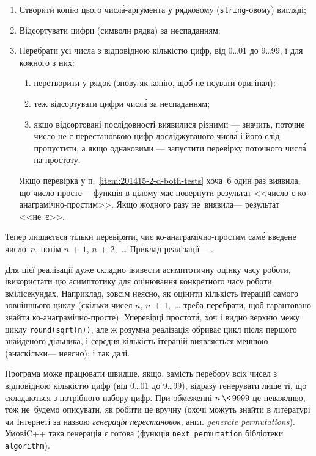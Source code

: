 \begin{enumerate}
\item
Створити копію цього числ\'{а}-аргумента у рядковому (\texttt{string}-овому) вигляді;
\item
Відсортувати цифри (символи рядка) за неспаданням;
\item
Перебрати усі числа з відповідною кількістю цифр, від 0\dots01 до 9\dots99, і для кожного з них:
\begin{enumerate}
\item
перетворити у рядок (знову як копію, щоб не псувати оригінал);
\item
теж відсортувати цифри числ\'{а} за неспаданням;
\item \label{item:201415-2-d-both-tests}
якщо відсортовані послідовності виявилися різними --- значить, поточне число не є перестановкою цифр досліджуваного числ\'{а} і його слід пропустити, а якщо однаковими --- запустити перевірку поточного числ\'{а} на простоту.
\end{enumerate}
Якщо перевірка у п.~\ref{item:201415-2-d-both-tests} хоча~б один раз виявила, що число просте\nolinebreak[3] --- функція в цілому має повернути результат <<число є ко-ана\-гра\-мічно-простим>>. Якщо жодного разу не~виявила\nolinebreak[3] --- результат <<не~є>>.
\end{enumerate}

Тепер лишається тільки перевіряти, чи\nolinebreak[3] є ко-ана\-гра\-мічно-простим сам\'{е} введене число~$n$, потім ${n\,{+}\,1}$, ${n\,{+}\,2}$,~\dots{} Приклад реалізації\nolinebreak[3] --- .

Для цієї реалізації дуже складно і\nolinebreak[3] вивести асимптотичну оцінку часу роботи, і\nolinebreak[3] використати цю асимптотику для оцінювання конкретного часу роботи в\nolinebreak[3] мілісекундах. Наприклад, зовсім не\nolinebreak[3] ясно, як оцінити кількість ітерацій самого зовнішнього циклу (скільки чисел $n$, ${n\,{+}\,1}$,~\dots{} треба перебрати, щоб гарантовано знайти ко-ана\-гра\-мічно-просте). У\nolinebreak[3] перевірці простот\'{и}, хоч і видно верхню межу циклу \verb"round(sqrt(n))", але ж розумна реалізація обриває цикл після першого знайденого дільника, і середня кількість ітерацій виявляється меншою (а\nolinebreak[3] наскільки\nolinebreak[3] --- не\nolinebreak[3] ясно); і так далі.

Програма може працювати швидше, якщо, замість перебору всіх чисел з відповідною кількістю цифр (від 0\dots01 до 9\dots99), відразу генерувати лише ті, що складаються з потрібного набору цифр. При обмеженні ${n\,{\<}\,9999}$ це неважливо, тож не~будемо описувати, як робити це вручну (охочі можуть знайти в літературі чи Інтернеті за назвою \emph{генерація перестановок}, англ. \emph{generate permutations}). У\nolinebreak[3] мові\nolinebreak[2] C++ така генерація є готова (функція \verb"next_permutation" бібліотеки \verb"algorithm").

